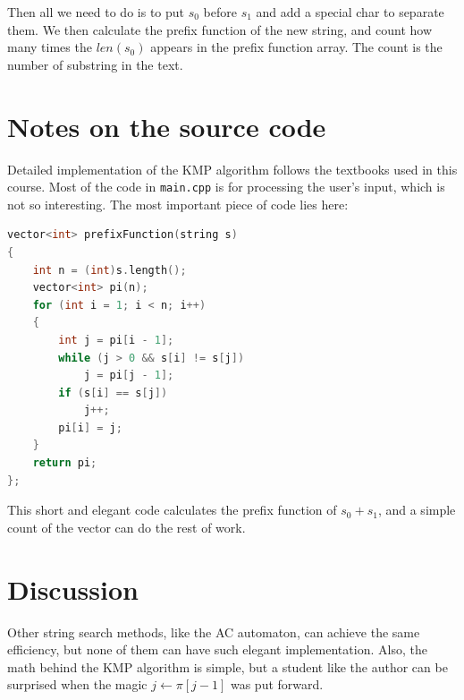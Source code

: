 \documentclass[cn,black,12pt,normal]{elegantnote}
\begin{document}
Then all we need to do is to put $s_0$ before $s_1$ and add a special char to separate them. We then calculate the prefix function of the new string, and count how many times the $len(s_0)$ appears in the prefix function array. The count is the number of substring in the text.

\section{Notes on the source code}

Detailed implementation of the KMP algorithm follows the textbooks used in this course. Most of the code in \lstinline{main.cpp} is for processing the user's input, which is not so interesting. The most important piece of code lies here:

\begin{lstlisting}[language = C++]
vector<int> prefixFunction(string s)
{
    int n = (int)s.length();
    vector<int> pi(n);
    for (int i = 1; i < n; i++)
    {
        int j = pi[i - 1];
        while (j > 0 && s[i] != s[j])
            j = pi[j - 1];
        if (s[i] == s[j])
            j++;
        pi[i] = j;
    }
    return pi;
};
\end{lstlisting}

This short and elegant code calculates the prefix function of $s_0+s_1$, and a simple count of the vector can do the rest of work.

\section{Discussion}

Other string search methods, like the AC automaton, can achieve the same efficiency, but none of them can have such elegant implementation. Also, the math behind the KMP algorithm is simple, but a student like the author can be surprised when the magic $j \gets \pi[j-1]$ was put forward.


\end{document}
